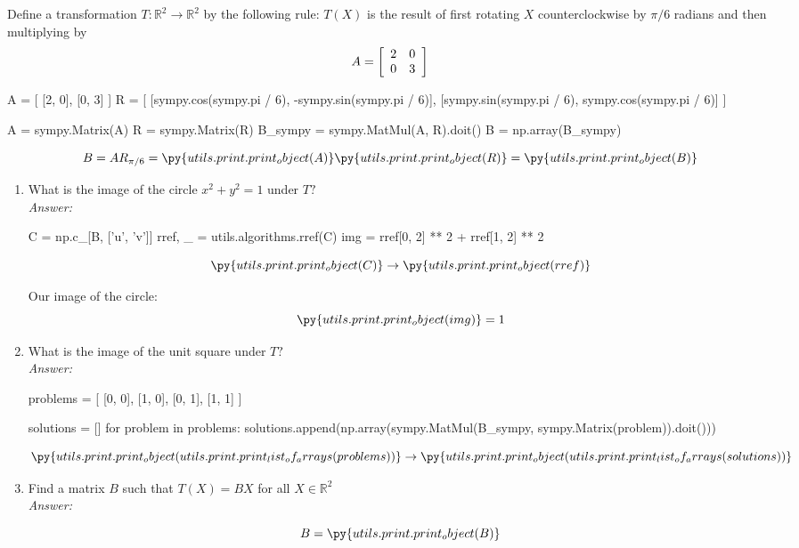 \documentclass[letterpaper]{article}
\newcommand{\ans}{\textit{Answer: }}
\newenvironment{question}[2][Question]{\begin{trivlist}
\item[\hskip \labelsep {\bfseries #1}\hskip \labelsep {\bfseries #2.}]}{\end{trivlist}}
\newcommand{\printobj}[1]{\py{utils.print.print_object(#1)}}
\begin{document}
\begin{question}{3.34}
    Define a transformation $T : \mathbb { R } ^ { 2 } \rightarrow \mathbb { R } ^ { 2 }$ by 
    the following rule: $T ( X )$ is the result
    of first rotating $X$ counterclockwise by $\pi / 6$ radians and then multiplying by
    $$
    A = \left[ \begin{array} { l l } { 2 } & { 0 } \\ { 0 } & { 3 } \end{array} \right]
    $$

\begin{pycode}
A = [
    [2, 0],
    [0, 3]
]
R = [
    [sympy.cos(sympy.pi / 6), -sympy.sin(sympy.pi / 6)],
    [sympy.sin(sympy.pi / 6), sympy.cos(sympy.pi / 6)]
]

A = sympy.Matrix(A)
R = sympy.Matrix(R)
B_sympy = sympy.MatMul(A, R).doit()
B = np.array(B_sympy)
\end{pycode}


    $$
    B = AR_{\pi/6} = \printobj{A} \printobj{R} = \printobj{B}
    $$

    \begin{enumerate}[label=(\alph*)]
        \item What is the image of the circle $x ^ { 2 } + y ^ { 2 } = 1$ under $T ?$ \\
        \ans 
\begin{pycode}
C = np.c_[B, ['u', 'v']]
rref, _ = utils.algorithms.rref(C)
img = rref[0, 2] ** 2 + rref[1, 2] ** 2
\end{pycode}

        $$\printobj{C} \rightarrow \printobj{rref}$$

        Our image of the circle:
        $$\printobj{img} = 1$$

        \item What is the image of the unit square under $T ?$ \\
        \ans 
\begin{pycode}
problems = [
    [0, 0],
    [1, 0],
    [0, 1],
    [1, 1]
]

solutions = []
for problem in problems:
    solutions.append(np.array(sympy.MatMul(B_sympy, sympy.Matrix(problem)).doit()))

\end{pycode}

        $$
        \printobj{utils.print.print_list_of_arrays(problems)}
        \rightarrow
        \printobj{utils.print.print_list_of_arrays(solutions)}
        $$

        \item Find a matrix $B$ such that $T ( X ) = B X$ for all $X \in \mathbb { R } ^ { 2 }$ \\
        \ans 

        $$B = \printobj{B}$$
    \end{enumerate}
\end{question}
\end{document}
